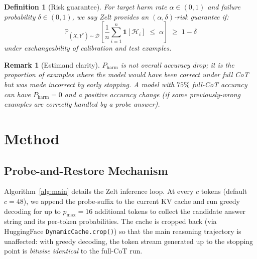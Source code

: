 \documentclass[11pt]{article}
\newtheorem{definition}{Definition}
\newtheorem{remark}{Remark}
\begin{document}
\begin{definition}[Risk guarantee]
For target harm rate $\alpha \in (0,1)$ and failure probability $\delta \in (0,1)$,
we say Zelt provides an $(\alpha, \delta)$-risk guarantee if:
\[
  \mathbb{P}_{(X,Y^*) \sim \mathcal{D}}\!\left[
    \frac{1}{n}\sum_{i=1}^{n} \mathbf{1}[\mathcal{H}_i] \;\le\; \alpha
  \right] \;\ge\; 1 - \delta
\]
under exchangeability of calibration and test examples.
\end{definition}

\begin{remark}[Estimand clarity]
$P_{\mathrm{harm}}$ is \emph{not} overall accuracy drop;
it is the proportion of examples where the model would have been
correct under full CoT but was made incorrect by early stopping.
A model with $75\%$ full-CoT accuracy can have $P_{\mathrm{harm}} = 0$
and a \emph{positive} accuracy change (if some previously-wrong examples
are correctly handled by a probe answer).
\end{remark}

\section{Method}
\label{sec:method}

\subsection{Probe-and-Restore Mechanism}

Algorithm~\ref{alg:main} details the Zelt inference loop.
At every $c$ tokens (default $c=48$), we append the probe-suffix
to the current KV cache and run greedy decoding for up to
$p_{\max}=16$ additional tokens to collect the candidate answer string
and its per-token probabilities.  The cache is cropped back
(via HuggingFace \texttt{DynamicCache.crop()}) so that the
main reasoning trajectory is unaffected: with greedy decoding,
the token stream generated up to the stopping point is
\emph{bitwise identical} to the full-CoT run.
\end{document}
